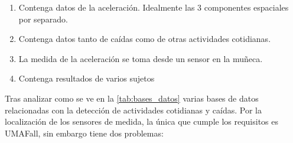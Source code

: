 \begin{enumerate}
  \item Contenga datos de la aceleración. Idealmente las 3 componentes espaciales por separado.
  \item Contenga datos tanto de caídas como de otras actividades cotidianas.
  \item La medida de la aceleración se toma desde un sensor en la muñeca.
  \item Contenga resultados de varios sujetos
\end{enumerate}

Tras analizar como se ve en la \autoref{tab:bases_datos} varias bases de datos relacionadas con la detección de actividades cotidianas y caídas. Por la localización de los sensores de medida, la única que cumple los requisitos es UMAFall, sin embargo tiene dos problemas:

